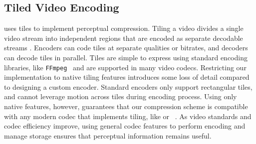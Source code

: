 \subsection{Tiled Video Encoding} \name uses tiles to implement perceptual compression.
Tiling a video divides a single video stream into independent regions that are encoded as separate decodable streams \cite{6547985}.
Encoders can code tiles at separate qualities or bitrates, and decoders can decode tiles in parallel.
Tiles are simple to express using standard encoding libraries, like \texttt{FFmpeg}~\cite{ffmpeg} and are supported in many video codecs.
Restricting our implementation to native tiling features introduces some loss of detail compared to designing a custom encoder.
Standard encoders only support rectangular tiles, and cannot leverage motion across tiles during encoding process.
Using only native features, however, guarantees that our compression scheme is compatible with any modern codec that implements tiling, like \hevc or \avone~\cite{avone}.
As video standards and codec efficiency improve, using general codec features to perform encoding and manage storage ensures that perceptual information remains useful.
